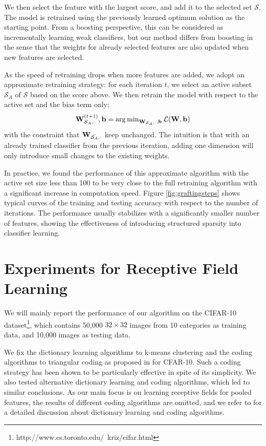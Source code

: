 We then select the feature with the largest score, and add it to the selected set $\mathcal{S}$. The model is retrained using the previously learned optimum solution as the starting point. From a boosting perspective, this can be considered as incrementally learning weak classifiers, but our method differs from boosting in the sense that the weights for already selected features are also updated when new features are selected.

As the speed of retraining drops when more features are added, we adopt an approximate retraining strategy: for each iteration $t$, we select an active subset $\mathcal{S}_{A}$ of $\mathcal{S}$ based on the score above. We then retrain the model with respect to the active set and the bias term only:
\begin{equation}
  \mathbf{W}^{(t+1)}_{\mathcal{S}_A,\cdot}, \mathbf{b} = \operatorname{\arg\min}_{\mathbf{W}_{\mathcal{S}_A,\cdot},\mathbf{b}}\mathcal{L}(\mathbf{W},\mathbf{b})
\end{equation}
with the constraint that $\mathbf{W}_{\bar{\mathcal{S}_A},\cdot}$ keep unchanged. The intuition is that with an already trained classifier from the previous iteration, adding one dimension will only introduce small changes to the existing weights. 

In practice, we found the performance of this approximate algorithm with the active set size less than 100 to be very close to the full retraining algorithm with a significant increase in computation speed. Figure \ref{fig:graftingsteps} shows typical curves of the training and testing accuracy with respect to the number of iterations. The performance usually stabilizes with a significantly smaller number of features, showing the effectiveness of introducing structured sparsity into classifier learning.

\section{Experiments for Receptive Field Learning}\label{sec:experiments}
We will mainly report the performance of our algorithm on the CIFAR-10 dataset\footnote{http://www.cs.toronto.edu/~kriz/cifar.html}, which contains 50,000 $32\times32$ images from 10 categories as training data, and 10,000 images as testing data.

We fix the dictionary learning algorithms to k-means clustering and the coding algorithms to triangular coding as proposed in \cite{coates2010aistats} for CFAR-10. Such a coding strategy has been shown to be particularly effective in spite of its simplicity. We also tested alternative dictionary learning and coding algorithms, which led to similar conclusions. As our main focus is on learning receptive fields for pooled features, the results of different coding algorithms are omitted, and we refer to \cite{coates2011icml} for a detailed discussion about dictionary learning and coding algorithms. 

